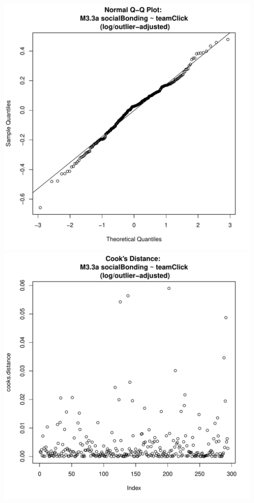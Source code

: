 \documentclass[12pt]{report}
\begin{document}
\includegraphics[scale =0.4]{../images/MLM33aOutLogQQNorm.pdf}
\includegraphics[scale =0.4]{../images/MLM33aOutLogCooksD.pdf}

\newpage
\end{document}
